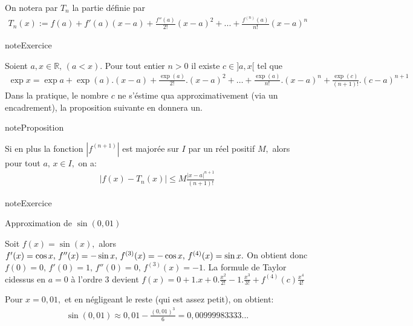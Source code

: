 \documentclass[letterpaper,10pt,french]{jupyterBook}
\begin{document}
\sphinxAtStartPar
On notera par \(T_n\) la partie définie par
\begin{equation*}
\begin{split}
T_n(x):=f(a)+f'(a)(x-a)+\frac{f''(a)}{2!}(x-a)^2+...+\frac{f^{(n)}(a)}{n!}(x-a)^n
\end{split}
\end{equation*}
\begin{sphinxadmonition}{note}{Exercice}

\sphinxAtStartPar
Soient \(a, x \in\mathbb{R},\,(a<x).\) Pour tout entier \(n > 0\) il existe \(c\in]a,x[\)  tel que
\begin{equation*}
\begin{split}
\exp x=\exp a+\exp (a).(x-a)+\frac{\exp (a)}{2!}.(x-a)^2+\ldots+\frac{\exp (a)}{n!}.(x-a)^n+\frac{\exp (c)}{(n+1)!}.(c-a)^{n+1}
\end{split}
\end{equation*}
\sphinxAtStartPar
Dans la pratique, le nombre \(c\) ne s’éstime qua approximativement (via un encadrement), la proposition suivante en donnera un.
\end{sphinxadmonition}

\begin{sphinxadmonition}{note}{Proposition}

\sphinxAtStartPar
Si en plus la fonction \(|f^{(n+1)}|\) est majorée sur \(I\) par un réel positif \(M,\) alors pour tout \(a,\,x \in I,\) on a:
\begin{equation*}
\begin{split}
|f(x)-T_n(x)|\leq M\frac{|x-a|^{n+1}}{(n+1)!}
\end{split}
\end{equation*}\end{sphinxadmonition}

\begin{sphinxadmonition}{note}{Exercice}

\sphinxAtStartPar
Approximation de \(\sin(0,01)\)

\sphinxAtStartPar
Soit \(f(x)=\sin(x),\) alors \(f'(x)=\cos x,\,f''(x)=-\sin x,\,f^{(3)}(x)=-\cos x,\\
\,f^{(4)}(x)=\sin x.\) On obtient donc \(f(0)=0,\,f'(0)=1,\,f''(0)=0,\,f^{(3)}(x)=-1.\) La formule de Taylor ci\sphinxhyphen{}dessus en \(a=0\) à l’ordre 3 devient \(f(x)=0+1.x+0.\frac{x^2}{2!}-1.\frac{x^3}{3!}+f^{(4)}(c)\frac{x^4}{4!}\)

\sphinxAtStartPar
Pour \(x=0,01,\) et en négligeant le reste (qui est assez petit), on obtient:
\begin{equation*}
\begin{split}
\sin(0,01)\approx 0,01-\frac{(0,01)^3}{6}=0,00999983333...
\end{split}
\end{equation*}\end{sphinxadmonition}
\end{document}
